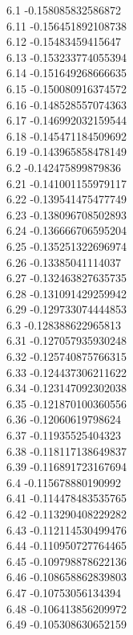 {6.1	-0.158085832586872\\
6.11	-0.156451892108738\\
6.12	-0.15483459415647\\
6.13	-0.153233774055394\\
6.14	-0.151649268666635\\
6.15	-0.150080916374572\\
6.16	-0.148528557074363\\
6.17	-0.146992032159544\\
6.18	-0.145471184509692\\
6.19	-0.143965858478149\\
6.2	-0.142475899879836\\
6.21	-0.141001155979117\\
6.22	-0.139541475477749\\
6.23	-0.138096708502893\\
6.24	-0.136666706595204\\
6.25	-0.135251322696974\\
6.26	-0.13385041114037\\
6.27	-0.132463827635735\\
6.28	-0.131091429259942\\
6.29	-0.129733074444853\\
6.3	-0.128388622965813\\
6.31	-0.127057935930248\\
6.32	-0.125740875766315\\
6.33	-0.124437306211622\\
6.34	-0.123147092302038\\
6.35	-0.121870100360556\\
6.36	-0.12060619798624\\
6.37	-0.11935525404323\\
6.38	-0.118117138649837\\
6.39	-0.116891723167694\\
6.4	-0.115678880190992\\
6.41	-0.114478483535765\\
6.42	-0.113290408229282\\
6.43	-0.112114530499476\\
6.44	-0.110950727764465\\
6.45	-0.109798878622136\\
6.46	-0.108658862839803\\
6.47	-0.10753056134394\\
6.48	-0.106413856209972\\
6.49	-0.105308630652159\\
}
